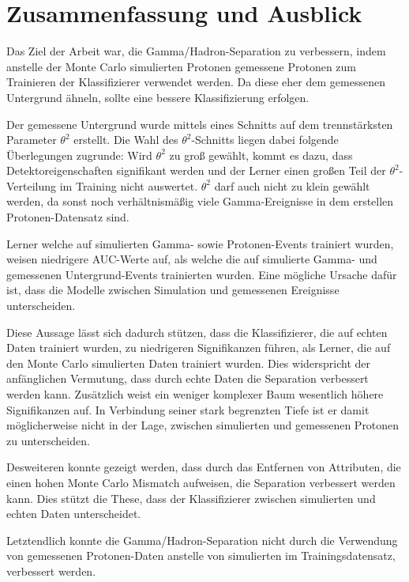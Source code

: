 \chapter{Zusammenfassung und Ausblick}
Das Ziel der Arbeit war, die Gamma/Hadron-Separation zu verbessern, indem anstelle der Monte Carlo simulierten Protonen gemessene Protonen zum Trainieren der Klassifizierer verwendet werden. 
Da diese eher dem gemessenen Untergrund ähneln, sollte eine bessere Klassifizierung erfolgen.

Der gemessene Untergrund wurde mittels eines Schnitts auf dem trennstärksten Parameter $\theta^{2}$ erstellt.
Die Wahl des $\theta^{2}$-Schnitts liegen dabei folgende Überlegungen zugrunde:
Wird $\theta^{2}$ zu groß gewählt, kommt es dazu, dass Detektoreigenschaften signifikant werden und der Lerner einen großen Teil der $\theta^{2}$-Verteilung im Training nicht auswertet. 
$\theta^{2}$ darf auch nicht zu klein gewählt werden, da sonst noch verhältnismäßig viele Gamma-Ereignisse in dem erstellen Protonen-Datensatz sind.

Lerner welche auf simulierten Gamma- sowie Protonen-Events trainiert wurden, weisen niedrigere AUC-Werte auf, als welche die auf simulierte Gamma- und gemessenen Untergrund-Events trainierten wurden.
Eine mögliche Ursache dafür ist, dass die Modelle zwischen Simulation und gemessenen Ereignisse unterscheiden.

Diese Aussage lässt sich dadurch stützen, dass die Klassifizierer, die auf echten Daten trainiert wurden, zu niedrigeren Signifikanzen führen, als Lerner, die auf den Monte Carlo simulierten Daten trainiert wurden. 
Dies widerspricht der anfänglichen Vermutung, dass durch echte Daten die Separation verbessert werden kann. 
Zusätzlich weist ein weniger komplexer Baum wesentlich höhere Signifikanzen auf. 
In Verbindung seiner stark begrenzten Tiefe ist er damit möglicherweise nicht in der Lage, zwischen simulierten und gemessenen Protonen zu unterscheiden. 

Desweiteren konnte gezeigt werden, dass durch das Entfernen von Attributen, die einen hohen Monte Carlo Mismatch aufweisen, die Separation verbessert werden kann. 
Dies stützt die These, dass der Klassifizierer zwischen simulierten und echten Daten unterscheidet.

Letztendlich konnte die Gamma/Hadron-Separation nicht durch die Verwendung von gemessenen Protonen-Daten anstelle von simulierten im Trainingsdatensatz, verbessert werden. 
